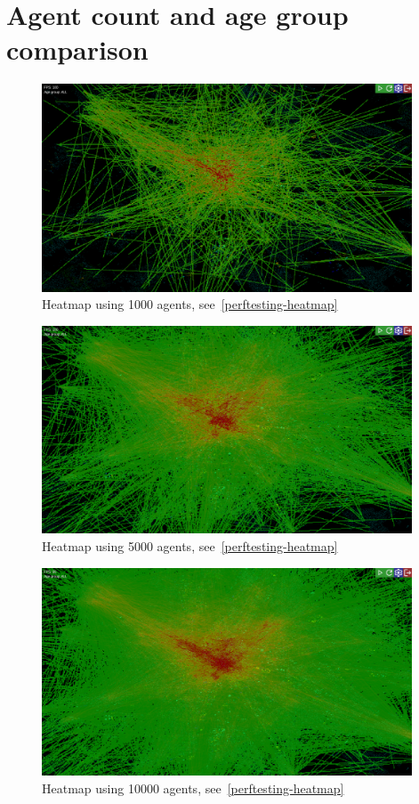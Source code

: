 \label{comparison_heatmap}
\chapter{Agent count and age group comparison}

\begin{figure}[!h]
    \centering
    \includegraphics[width=110mm, keepaspectratio]{images/heatmap_1000.png}
    \caption{Heatmap using 1000 agents, see~\ref{perftesting-heatmap}}
\end{figure}
\begin{figure}[!h]
    \centering
    \includegraphics[width=110mm, keepaspectratio]{images/heatmap_5000.png}
    \caption{Heatmap using 5000 agents, see~\ref{perftesting-heatmap}}
\end{figure}
\begin{figure}[!h]
    \centering
    \includegraphics[width=110mm, keepaspectratio]{images/heatmap_10000.png}
    \caption{Heatmap using 10000 agents, see~\ref{perftesting-heatmap}}
\end{figure}
